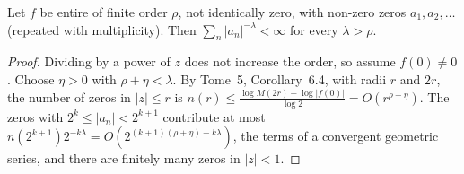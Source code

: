 \begin{lemma}\label{lem:zerocount}
Let $f$ be entire of finite order $\rho$, not identically zero, with non-zero zeros $a_1,a_2,\dots$ (repeated with multiplicity). Then $\sum_n|a_n|^{-\lambda}<\infty$ for every $\lambda>\rho$.
\end{lemma}
\begin{proof}
Dividing by a power of $z$ does not increase the order, so assume $f(0)\ne0$. Choose $\eta>0$ with $\rho+\eta<\lambda$. By Tome~5, Corollary~6.4, with radii $r$ and $2r$, the number of zeros in $|z|\le r$ is
$n(r)\le\frac{\log M(2r)-\log|f(0)|}{\log2}=O(r^{\rho+\eta})$. The zeros with $2^k\le|a_n|<2^{k+1}$ contribute at most $n(2^{k+1})2^{-k\lambda}=O(2^{(k+1)(\rho+\eta)-k\lambda})$, the terms of a convergent geometric series, and
there are finitely many zeros in $|z|<1$.
\end{proof}

